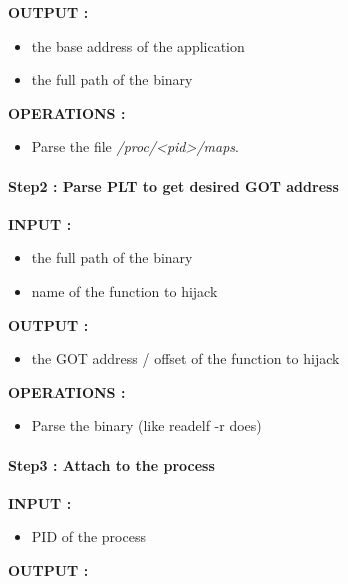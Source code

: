 \documentclass[letterpaper,10pt,english]{sphinxmanual}
\begin{document}
\textbf{OUTPUT :}
\begin{itemize}
\item {} 
the base address of the application

\item {} 
the full path of the binary

\end{itemize}

\textbf{OPERATIONS :}
\begin{itemize}
\item {} 
Parse the file \emph{/proc/\textless{}pid\textgreater{}/maps}.

\end{itemize}


\paragraph{Step2 : Parse PLT to get desired GOT address}
\label{Annexes/index:step2-parse-plt-to-get-desired-got-address}
\textbf{INPUT :}
\begin{itemize}
\item {} 
the full path of the binary

\item {} 
name of the function to hijack

\end{itemize}

\textbf{OUTPUT :}
\begin{itemize}
\item {} 
the GOT address / offset of the function to hijack

\end{itemize}

\textbf{OPERATIONS :}
\begin{itemize}
\item {} 
Parse the binary (like readelf -r does)

\end{itemize}


\paragraph{Step3 : Attach to the process}
\label{Annexes/index:step3-attach-to-the-process}
\textbf{INPUT :}
\begin{itemize}
\item {} 
PID of the process

\end{itemize}

\textbf{OUTPUT :}
\end{document}
